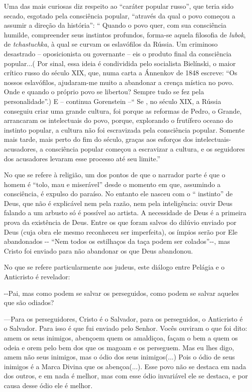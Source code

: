 Uma das mais curiosas diz respeito ao ``caráter popular russo'', que
teria sido secado, esgotado pela consciência popular, ``através da qual
o povo começou a assumir a direção da história'': `` Quando o povo quer,
com sua consciência humilde, compreender seus instintos profundos,
forma-se aquela filosofia de \emph{lubok}, de \emph{tchastuchka}, à qual
se curvam os eslavófilos da Rússia. Um criminoso desastrado --
oposicionista ou governante -- eis o produto final da consciência
popular...( Por sinal, essa ideia é condividida pelo socialista
Bielínski, o maior crítico russo do século XIX, que, numa carta a
Ánnenkov de 1848 escreve: ``Os nossos eslavófilos, ajudaram-me muito a
abandonar a crença mística no povo. Onde e quando o próprio povo se
libertou? Sempre tudo se fez pela personalidade''.) E -- continua
Gorenstein --`` Se , no século XIX, a Rússia conseguiu criar uma grande
cultura, foi porque as reformas de Pedro, o Grande, arrancaram os
intelectuais do povo, porque, explorando o frutífero oceano do instinto
popular, a cultura não foi escravizada pela consciência popular. Somente
mais tarde, mais perto do fim do século, graças aos esforços dos
intelectuais-acusadores, a consciência popular começou a escravizar a
cultura, e os seguidores dos acusadores levaram esse processo até seu
limite.''

No que se refere à religião, um dos pontos de que o narrador parte é que
o homem é ``tolo, mau e miserável'' desde o momento em que, assumindo a
consciência, é expulso do paraíso. No entanto ele nasceu com o ``
instinto'' de Deus, que não é explicável nem pela razão, nem pela
inteligência: ouvir Deus falando a um arbusto só é possível ao artista.
A necessidade de Deus é a primeira prova da existência de Deus. Entre os
que foram salvos do dilúvio enviado por Deus (cuja obra ele mesmo
reconheceu ser imperfeita), os ímpios serão por Ele abandonados -\/-
``Nem todos os estilhaços da taça podem ser colados''-\/-, mas Cristo
foi enviado para não abandonar os que Deus abandonou.

No que se refere particularmente aos judeus, este diálogo entre Pelágia
e o Anticristo é revelador:

-\/-Pai, mas como podem se salvar os perseguidos, como podem se salvar
aqueles que são odiados?

---Para os perseguidores, Cristo é o Salvador, para os perseguidos, o
Anticristo é o Salvador. Para isso é que fui enviado pelo Senhor. Vocês
ouviram o que foi dito: amem os seus inimigos, abençoem quem os
amaldiçoa, façam o bem a quem os odeia e orem pelo bem dos que os magoam
e os perseguem. Mas eu lhes digo, amem não seus inimigos, mas o ódio dos
seus inimigos(...) Pois o ódio de seus inimigos é a Marca Divina que os
abençoa(...). Esse povo não se destaca em nada dos outros, e em nada é
melhor, mas com esse ódio invariável ele se destaca, e por causa desse
ódio ele é melhor.

